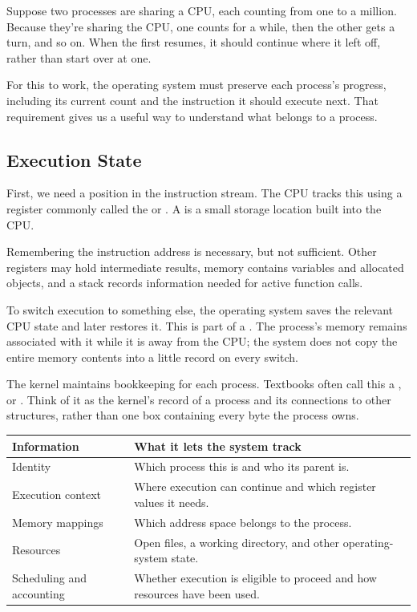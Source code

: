 \documentclass[11pt]{article}
\begin{document}
Suppose two processes are sharing a CPU, each counting from one to a million.
Because they're sharing the CPU, one counts for a while, then the other gets a turn, and so on.
When the first resumes, it should continue where it left off, rather than start over at one.

For this to work, the operating system must preserve each process's progress, including its current count and the instruction it should execute next.
That requirement gives us a useful way to understand what belongs to a process.

\subsection{Execution State}

First, we need a position in the instruction stream.
The CPU tracks this using a register commonly called the  or .
A  is a small storage location built into the CPU.

Remembering the instruction address is necessary, but not sufficient.
Other registers may hold intermediate results, memory contains variables and allocated objects, and a stack records information needed for active function calls.

To switch execution to something else, the operating system saves the relevant CPU state and later restores it.
This is part of a .
The process's memory remains associated with it while it is away from the CPU; the system does not copy the entire memory contents into a little record on every switch.

The kernel maintains bookkeeping for each process.
Textbooks often call this a , or .
Think of it as the kernel's record of a process and its connections to other structures, rather than one box containing every byte the process owns.

\begin{center}
\begin{tabularx}{\linewidth}{@{}lX@{}}
\toprule
\textbf{Information} & \textbf{What it lets the system track} \\
\midrule
Identity & Which process this is and who its parent is. \\
Execution context & Where execution can continue and which register values it needs. \\
Memory mappings & Which address space belongs to the process. \\
Resources & Open files, a working directory, and other operating-system state. \\
Scheduling and accounting & Whether execution is eligible to proceed and how resources have been used. \\
\bottomrule
\end{tabularx}
\end{center}
\end{document}
